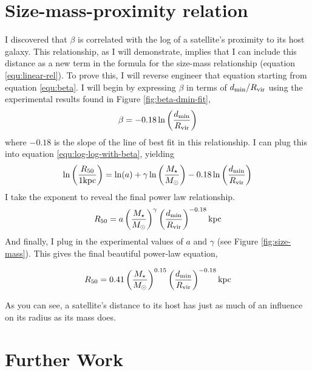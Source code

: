 
\section{Size-mass-proximity relation}

I discovered that $\beta$ is correlated with the log of a satellite's proximity to its host galaxy. This relationship, as I will demonstrate, implies that I can include this distance as a new term in the formula for the size-mass relationship (equation \ref{equ:linear-rel}). To prove this, I will reverse engineer that equation starting from equation \ref{equ:beta}. I will begin by expressing $\beta$ in terms of $d_{\rm{min}} / R_{\rm{vir}}$ using the experimental results found in Figure \ref{fig:beta-dmin-fit},
\begin{equation}
    \beta = -0.18 \ln\left( \frac{d_{\rm{min}}}{R_{\rm{vir}}} \right)
\end{equation}
where $-0.18$ is the slope of the line of best fit in this relationship. I can plug this into equation \ref{equ:log-log-with-beta}, yielding
\begin{equation}
    \ln \left(
        \frac{R_{50}}{1 \rm{ kpc}}
    \right)
    =
    \ln(a)
    + \gamma \ln \left(
        \frac{M_\star}{M_\odot}
    \right)
    -0.18 \ln\left( \frac{d_{\rm{min}}}{R_{\rm{vir}}} \right)
\end{equation}
I take the exponent to reveal the final power law relationship.
\begin{equation}
    R_{50} = a
    \left( \frac{M_\star}{M_\odot} \right)^\gamma
    \left( \frac{d_{\rm{min}}}{R_{\rm{vir}}} \right)^{-0.18}
    \text{kpc}
\end{equation}
And finally, I plug in the experimental values of $a$ and $\gamma$ (see Figure \ref{fig:size-mass}). This gives the final beautiful power-law equation,

\begin{equation}
    R_{50} = 0.41
    \left( \frac{M_\star}{M_\odot} \right)^{0.15}
    \left( \frac{d_{\rm{min}}}{R_{\rm{vir}}} \right)^{-0.18}
    \text{kpc}
\end{equation}

As you can see, a satellite's distance to its host has just as much of an influence on its radius as its mass does. 




\section{Further Work}

